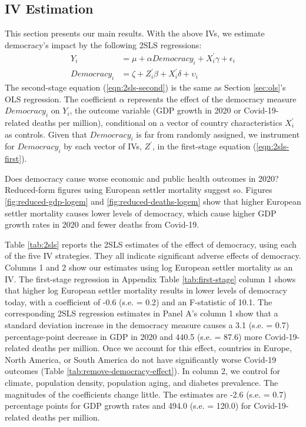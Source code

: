 \subsection{IV Estimation} \label{subsec:equation}
This section presents our main results. 
With the above IVs, we estimate democracy's impact by the following 2SLS regressions: 
\begin{align}
    Y_i &= \mu + \alpha Democracy_i + X^{'}_i \gamma + \epsilon_i \tag{1} \label{eqn:2sls-second}\\
    Democracy_i &= \zeta + Z^{'}_i\beta  + X^{'}_i \delta + \upsilon_i \label{eqn:2sls-first}
\end{align}
\noindent The second-stage equation (\ref{eqn:2sls-second}) is the same as Section \ref{sec:ols}'s OLS regression. The coefficient $\alpha$ represents the effect of the democracy measure $Democracy_i$ on $Y_i$, the outcome variable (GDP growth in 2020 or Covid-19-related deaths per million), conditional on a vector of country characteristics $X^{'}_i$ as controls. Given that $Democracy_i$ is far from randomly assigned, we instrument for $Democracy_i$ by each vector of IVs, $Z^{'}$, in the first-stage equation (\ref{eqn:2sls-first}).  

Does democracy cause worse economic and public health outcomes in 2020? Reduced-form figures using European settler mortality suggest so. Figures \ref{fig:reduced-gdp-logem} and \ref{fig:reduced-deaths-logem} show that higher European settler mortality causes lower levels of democracy, which cause higher GDP growth rates in 2020 and fewer deaths from Covid-19. 

Table \ref{tab:2sls} reports the 2SLS estimates of the effect of democracy, using each of the five IV strategies. They all indicate significant adverse effects of democracy. 
Columns 1 and 2 show our estimates using log European settler mortality as an IV. The first-stage regression in Appendix Table \ref{tab:first-stage} column 1 shows that higher log European settler mortality results in lower levels of democracy today, with a coefficient of -0.6 (s.e. = 0.2) and an F-statistic of 10.1. The corresponding 2SLS regression estimates in Panel A's column 1 show that a standard deviation increase in the democracy measure causes a 3.1 (s.e. = 0.7) percentage-point decrease in GDP in 2020 and 440.5 (s.e. = 87.6) more Covid-19-related deaths per million. Once we account for this effect, countries in Europe, North America, or South America do not have significantly worse Covid-19 outcomes (Table \ref{tab:remove-democracy-effect}). In column 2, we control for climate, population density, population aging, and diabetes prevalence. The magnitudes of the coefficients change little. The estimates are -2.6 (s.e. = 0.7) percentage points for GDP growth rates and 494.0 (s.e. = 120.0) for Covid-19-related deaths per million. 

